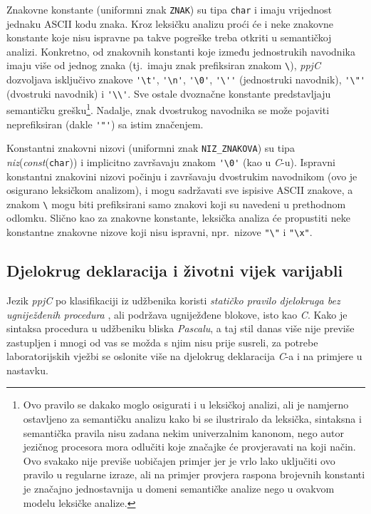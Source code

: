 \documentclass[times, 12pt, utf8]{book}
\begin{document}
Znakovne konstante (uniformni znak \verb|ZNAK|) su tipa \verb|char| i imaju vrijednost jednaku ASCII kodu znaka.
Kroz leksičku analizu proći će i neke znakovne konstante koje nisu ispravne pa takve pogreške treba otkriti u semantičkoj analizi.
Konkretno, od znakovnih konstanti koje između jednostrukih navodnika imaju više od jednog znaka (tj.~imaju znak prefiksiran znakom \verb|\|), \emph{ppjC} dozvoljava isključivo znakove \verb|'\t'|, \verb|'\n'|, \verb|'\0'|, \verb|'\''| (jednostruki navodnik), \verb|'\"'| (dvostruki navodnik) i \verb|'\\'|.
Sve ostale dvoznačne konstante predstavljaju semantičku grešku\footnote{Ovo pravilo se dakako moglo osigurati i u leksičkoj analizi, ali je namjerno ostavljeno za semantičku analizu kako bi se ilustriralo da leksička, sintaksna i semantička pravila nisu zadana nekim univerzalnim kanonom, nego autor jezičnog procesora mora odlučiti koje značajke će provjeravati na koji način. Ovo svakako nije previše uobičajen primjer jer je vrlo lako uključiti ovo pravilo u regularne izraze, ali na primjer provjera raspona brojevnih konstanti je značajno jednostavnija u domeni semantičke analize nego u ovakvom modelu leksičke analize.}.
Nadalje, znak dvostrukog navodnika se može pojaviti neprefiksiran (dakle \verb|'"'|) sa istim značenjem.

Konstantni znakovni nizovi (uniformni znak \verb|NIZ_ZNAKOVA|) su tipa \emph{niz}(\emph{const}(\verb|char|)) i implicitno završavaju znakom \verb|'\0'| (kao u \emph{C}-u).
Ispravni konstantni znakovini nizovi počinju i završavaju dvostrukim navodnikom (ovo je osigurano leksičkom analizom), i mogu sadržavati sve ispisive ASCII znakove, a znakom \verb|\| mogu biti prefiksirani samo znakovi koji su navedeni u prethodnom odlomku.
Slično kao za znakovne konstante, leksička analiza će propustiti neke konstantne znakovne nizove koji nisu ispravni, npr.~nizove \verb|"\"| i \verb|"\x"|.

\subsection{Djelokrug deklaracija i životni vijek varijabli}
Jezik \emph{ppjC} po klasifikaciji iz udžbenika koristi \emph{statičko pravilo djelokruga bez ugniježđenih procedura} \cite[str.~223--224]{udzbenik}, ali podržava ugniježđene blokove, isto kao \emph{C}.
Kako je sintaksa procedura u udžbeniku bliska \emph{Pascalu}, a taj stil danas više nije previše zastupljen i mnogi od vas se možda s njim nisu prije susreli, za potrebe laboratorijskih vježbi se oslonite više na djelokrug deklaracija \emph{C}-a i na primjere u nastavku.
\end{document}
